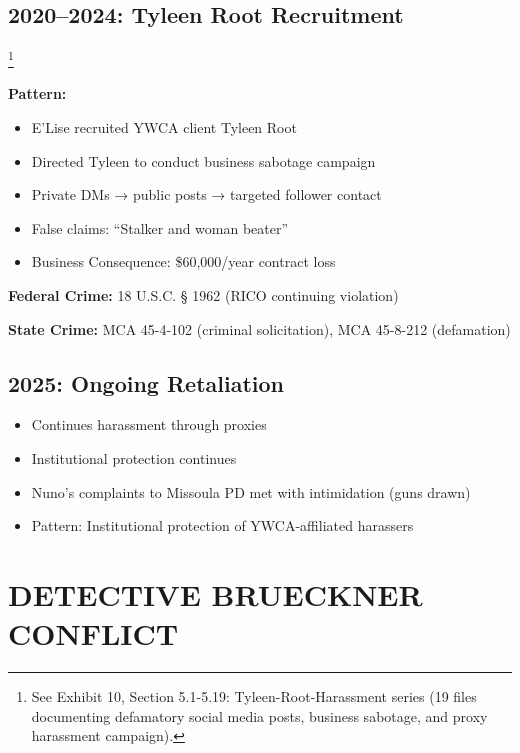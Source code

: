 \documentclass[12pt,oneside]{article}
\begin{document}
\subsection*{2020--2024: Tyleen Root Recruitment}\footnote{See Exhibit 10, Section 5.1-5.19: Tyleen-Root-Harassment series (19 files documenting defamatory social media posts, business sabotage, and proxy harassment campaign).}

\textbf{Pattern:}

\begin{itemize}

\item E'Lise recruited YWCA client Tyleen Root

\item Directed Tyleen to conduct business sabotage campaign

\item Private DMs → public posts → targeted follower contact

\item False claims: ``Stalker and woman beater''

\item Business Consequence: \$60,000/year contract loss

\end{itemize}

\textbf{Federal Crime:} 18 U.S.C. § 1962 (RICO continuing violation)

\textbf{State Crime:} MCA 45-4-102 (criminal solicitation), MCA 45-8-212 (defamation)

\subsection*{2025: Ongoing Retaliation}

\begin{itemize}

\item Continues harassment through proxies

\item Institutional protection continues

\item Nuno's complaints to Missoula PD met with intimidation (guns drawn)

\item Pattern: Institutional protection of YWCA-affiliated harassers

\end{itemize}

\section*{DETECTIVE BRUECKNER CONFLICT}
\end{document}
